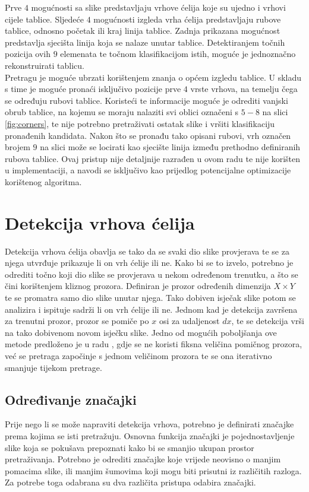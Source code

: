 \documentclass[times, utf8, zavrsni, numeric]{fer}
\begin{document}
Prve $4$ mogućnosti sa slike predstavljaju vrhove ćelija koje su ujedno i vrhovi cijele tablice. 
Sljedeće $4$ mogućnosti izgleda vrha ćelija predstavljaju rubove tablice, odnosno početak ili kraj linija tablice.
Zadnja prikazana mogućnost predstavlja sjecišta linija koja se nalaze unutar tablice.
Detektiranjem točnih pozicija ovih $9$ elemenata te točnom klasifikacijom istih, moguće je jednoznačno rekonstruirati tablicu.\\

Pretragu je moguće ubrzati korištenjem znanja o općem izgledu tablice.
U skladu s time je moguće pronaći isključivo pozicije prve $4$ vrste vrhova, na temelju čega se određuju rubovi tablice.
Koristeći te informacije moguće je odrediti vanjski obrub tablice, na kojemu se moraju nalaziti svi oblici označeni s $5-8$ na slici \ref{fig:corners}, te nije potrebno pretraživati ostatak slike i vršiti klasifikaciju pronađenih kandidata.
Nakon što se pronađu tako opisani rubovi, vrh označen brojem $9$ na slici može se locirati kao sjecište linija između prethodno definiranih rubova tablice.
Ovaj pristup nije detaljnije razrađen u ovom radu te nije korišten u implementaciji, a navodi se isključivo kao prijedlog potencijalne optimizacije korištenog algoritma.

\section{Detekcija vrhova ćelija}
Detekcija vrhova ćelija obavlja se tako da se svaki dio slike provjerava te se za njega utvrđuje prikazuje li on vrh ćelije ili ne. 
Kako bi se to izvelo, potrebno je odrediti točno koji dio slike se provjerava u nekom određenom trenutku, a što se čini korištenjem kliznog prozora. 
Definiran je prozor određenih dimenzija $X\times Y$ te se promatra samo dio slike unutar njega. 
Tako dobiven isječak slike potom se analizira i ispituje sadrži li on vrh ćelije ili ne.
Jednom kad je detekcija završena za trenutni prozor, prozor se pomiče po $x$ osi za udaljenost $dx$, te se detekcija vrši na tako dobivenom novom isječku slike.
Jedno od mogućih poboljšanja ove metode predloženo je u radu \cite{ViolaJones}, gdje se ne koristi fiksna veličina pomičnog prozora, već se pretraga započinje s jednom veličinom prozora te se ona iterativno smanjuje tijekom pretrage.


\subsection{Određivanje značajki}
Prije nego li se može napraviti detekcija vrhova, potrebno je definirati značajke prema kojima se isti pretražuju.
Osnovna funkcija značajki je pojednostavljenje slike koja se pokušava prepoznati kako bi se smanjio ukupan prostor pretraživanja.
Potrebno je odrediti značajke koje vrijede neovisno o manjim pomacima slike, ili manjim šumovima koji mogu biti prisutni iz različitih razloga.
Za potrebe toga odabrana su dva različita pristupa odabira značajki.\\
\end{document}
